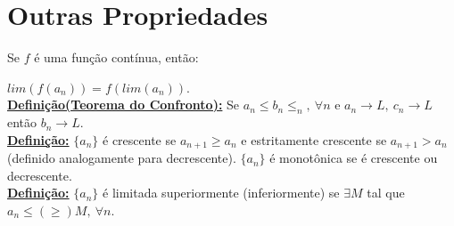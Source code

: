 \documentclass[12pt]{book}
\newcommand{\mytitle}[1]{\textbf{\underline{#1}}}
\begin{document}
\section{Outras Propriedades}

Se $f$ é uma função contínua, então:

$lim(f(a_n))=f(lim(a_n))$.\\
\mytitle{Definição(Teorema do Confronto):} Se $a_n\leq b_n \leq _n,\: \forall n$ e $a_n\rightarrow L,\: c_n\rightarrow L$ então $b_n\rightarrow L$.\\
\mytitle{Definição:} $\{a_n\}$ é crescente se $a_{n+1}\geq a_n$ e estritamente crescente se $a_{n+1}>a_n$ (definido analogamente para decrescente). $\{a_n\}$ é monotônica se é crescente ou decrescente.\\
\mytitle{Definição:} $\{a_n\}$ é limitada superiormente (inferiormente) se $\exists M$ tal que $a_n\leq (\geq) M,\: \forall n$.
\end{document}
